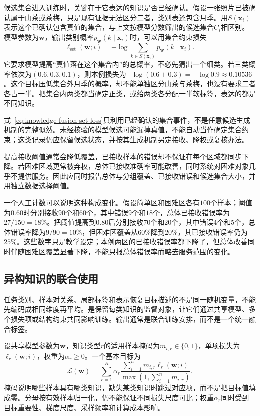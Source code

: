 候选集合进入训练时，关键在于它表达的知识是否已经确认。假设一张照片已被确认属于山茶或茶梅，只是现有证据无法区分二者，类别表还包含月季。用$S(\bm{x}_i)$表示这个已确认包含真值的集合，与上文按模型分数筛出的候选集合$C_i$相区别。模型参数为$\bm{w}$，输出类别概率$p_{\bm{w}}(k\mid\bm{x}_i)$时，可以用集合约束损失
\begin{equation}
  \ell_{\mathrm{set}}(\bm{w};i)
  =-\log\sum_{k\in S(\bm{x}_i)}
    p_{\bm{w}}(k\mid\bm{x}_i).
  \label{eq:knowledge-fusion-set-loss}
\end{equation}
它要求模型提高“真值落在这个集合内”的总概率，不必先猜出一个细类。若三类概率依次为$(0.6,0.3,0.1)$，则本例损失为$-\log(0.6+0.3)=-\log0.9\approx0.10536$。这个目标压低集合外月季的概率，却不能单独区分山茶与茶梅，也没有要求二者各占一半。把集合内两类都当确定正类，或给两类各分配一半软标签，表达的都是不同知识。

式~\eqref{eq:knowledge-fusion-set-loss}只利用已经确认的集合事件，不是任意候选生成机制的完整似然。未经核验的模型候选可能漏掉真值，不能自动当作确定集合约束；这类记录仍应保留候选状态，并按其生成机制另定接收、降权或复核办法。

提高接收阈值通常会降低覆盖，已接收样本的错误却不保证在每个区域都同步下降。若困难区域更常被弃权，总体已接收准确率可能改善，同时系统对困难对象几乎不提供服务。因此应同时报告总体与分组覆盖、已接收错误和候选集合大小，并用独立数据选择阈值。

一个人工计数可以说明这种构成变化。假设简单区和困难区各有$100$个样本；阈值为$0.60$时分别接收$90$个和$60$个，其中错误$9$个和$18$个，总体已接收错误率为$27/150=18\%$。把阈值提高到$0.80$后分别接收$70$个和$20$个，其中错误$4$个和$5$个，总体错误率降为$9/90=10\%$，但困难区覆盖从$60\%$降到$20\%$，其已接收错误率仍为$25\%$。这些数字只是教学设定；本例两区的已接收错误率都下降了，但总体改善同时伴随困难区覆盖显著下降，不能只报总体错误率而略去服务范围的变化。

\subsection{异构知识的联合使用}
\label{sec:knowledge-fusion-heterogeneous-use}

任务类别、样本对关系、局部标签和表示恢复目标描述的不是同一随机变量，不能先编码成相同维度再平均。是保留每类知识的监督对象，让它们通过共享模型、多个损失项或结构约束共同影响训练。输出通常是联合训练安排，而不是一个统一融合标签。

设共享模型参数为$\bm{w}$，知识类型$r$的适用样本掩码为$m_{i,r}\in\{0,1\}$，单项损失为$\ell_r(\bm{w};i)$，权重为$\alpha_r\geq0$。一个基本目标为
\begin{equation}
  \mathcal{L}(\bm{w})
  =
  \sum_{r=1}^{R}
  \alpha_r
  \frac{\sum_{i=1}^{n}m_{i,r}\ell_r(\bm{w};i)}
  {\max\left(1,\sum_{i=1}^{n}m_{i,r}\right)}.
  \label{eq:knowledge-fusion-heterogeneous-objective}
\end{equation}
掩码说明哪些样本具有哪类知识，缺失某类知识时跳过对应项，而不是把目标值填成零。分母按有效样本归一化，仍不能保证不同损失尺度可比；权重$\alpha_r$同时受到目标重要性、梯度尺度、采样频率和计算成本影响。

